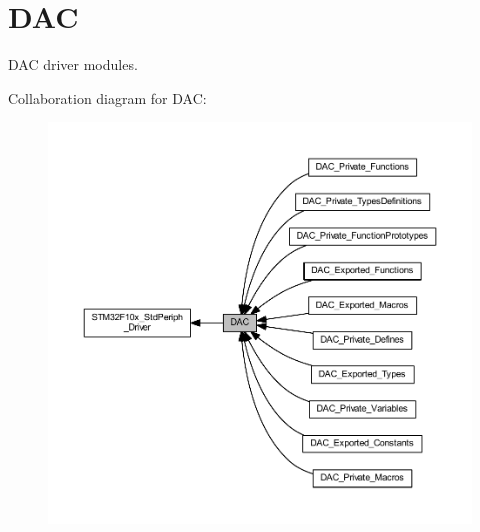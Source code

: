 \hypertarget{group___d_a_c}{}\section{D\+AC}
\label{group___d_a_c}


D\+AC driver modules.  


Collaboration diagram for D\+AC\+:
\nopagebreak
\begin{figure}[H]
\begin{center}
\leavevmode
\includegraphics[width=350pt]{group___d_a_c}
\end{center}
\end{figure}
